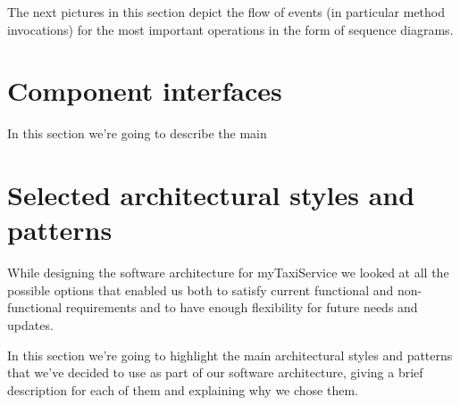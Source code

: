 The next pictures in this section depict the flow of events (in particular method invocations) for the most important operations in the form of sequence diagrams. 
\begin{landscape}

\end{landscape}


\section{Component interfaces}
In this section we're going to describe the main 

\section{Selected architectural styles and patterns}
While designing the software architecture for myTaxiService we looked at all the possible options that enabled us both to satisfy current functional and non-functional requirements and to have enough flexibility for future needs and updates.

In this section we're going to highlight the main architectural styles and patterns that we've decided to use as part of our software architecture, giving a brief description for each of them and explaining why we chose them.

